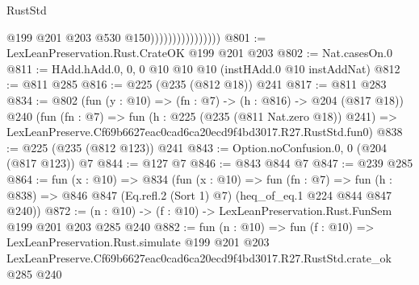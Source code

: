 \begin{lexlean}{RustStd}
\begin{coremodule}
                                    @199
                                    @201
                                    @203
                                    @530
                                    @150))))))))))))))))
@801 := LexLeanPreservation.Rust.CrateOK @199 @201 @203
@802 := Nat.casesOn.{0}
@811 := HAdd.hAdd.{0, 0, 0} @10 @10 @10 (instHAdd.{0} @10 instAddNat)
@812 := @811 @285
@816 := @225 (@235 (@812 @18)) @241
@817 := @811 @283
@834 := @802
    (fun (y : @10) => (fn : @7) -> (h : @816) -> @204 (@817 @18))
    @240
    (fun (fn : @7) =>
    fun (h : @225 (@235 (@811 Nat.zero @18)) @241) =>
    LexLeanPreserve.Cf69b6627eac0cad6ca20ecd9f4bd3017.R27.RustStd.fun0)
@838 := @225 (@235 (@812 @123)) @241
@843 := Option.noConfusion.{0, 0} (@204 (@817 @123)) @7
@844 := @127 @7
@846 := @843 @844 @7
@847 := @239 @285
@864 := fun (x : @10) =>
  @834
    (fun (x : @10) =>
    fun (fn : @7) =>
    fun (h : @838) => @846 @847 (Eq.refl.{2} (Sort 1) @7) (heq_of_eq.{1} @224 @844 @847 @240))
@872 := (n : @10) -> (f : @10) -> LexLeanPreservation.Rust.FunSem @199 @201 @203 @285 @240
@882 := fun (n : @10) =>
  fun (f : @10) =>
  LexLeanPreservation.Rust.simulate
    @199
    @201
    @203
    LexLeanPreserve.Cf69b6627eac0cad6ca20ecd9f4bd3017.R27.RustStd.crate_ok
    @285
    @240
\end{coremodule}
\end{lexlean}

